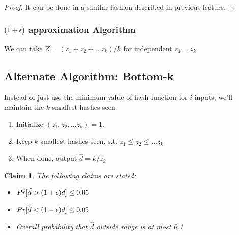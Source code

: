 \documentclass[11pt]{article}
\newtheorem{claim}[theorem]{Claim}
\def\eps{\ensuremath\epsilon}
\begin{document}
\begin{proof}
It can be done in a similar fashion described in previous lecture.
\end{proof}

\subsubsection{$(1+\eps)$ approximation Algorithm }
We can take $Z = (z_{1} + z_{2} + ... z_{k})/k$ for independent $z_{1}, ... z_{k}$

\subsection{Alternate Algorithm: Bottom-k}
Instead of just use the minimum value of hash function for $i$ inputs, we'll maintain the $k$ smallest hashes seen.
\begin{enumerate}
\item Initialize $(z_{1}, z_{2},...z_{k}) = 1$.
\item Keep $k$ smallest hashes seen, s.t. $z_{1}\leq z_{2}\leq...z_{k}$
\item When done, output $\hat{d} = k/z_{k}$
\end{enumerate}

\begin{claim}
The following claims are stated:
\begin{itemize}
\item $Pr[\hat{d} > (1 + \eps)d] \leq 0.05$
\item $Pr[\hat{d} < (1 - \eps)d] \leq 0.05$
\item Overall probability that $\hat{d}$ outside range is at most 0.1
\end{itemize}
\end{claim}
\end{document}
